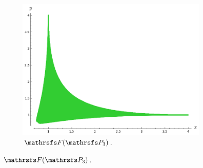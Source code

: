 \documentclass{beamer}
\begin{document}
\begin{frame}
\begin{figure}
\begin{subfigure}{.32\linewidth}
\includegraphics[width=1\textwidth]{plots/ch5_06_P3.png}
\caption{$\FFF(\PP_3)$.}
\end{subfigure}

\end{figure}

\end{frame}
\end{document}
